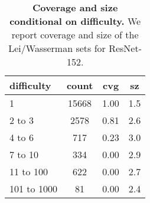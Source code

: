 \begin{table}[t]
\centering
\tiny
\begin{tabular}{lccc} 
\toprule
difficulty & count & cvg & sz \\ 
\midrule
1      & 15668 & 1.00 & 1.5  \\ 
2 to 3      & 2578 & 0.81 & 2.6  \\ 
4 to 6      & 717 & 0.23 & 3.0  \\ 
7 to 10      & 334 & 0.00 & 2.9  \\ 
11 to 100      & 622 & 0.00 & 2.7  \\ 
101 to 1000      & 81 & 0.00 & 2.4  \\ 
\bottomrule
\end{tabular}
\caption{\textbf{Coverage and size conditional on difficulty.} We report coverage and size of the Lei/Wasserman sets for ResNet-152.}
\label{table:lei-wasserman-difficulty}
\end{table}
